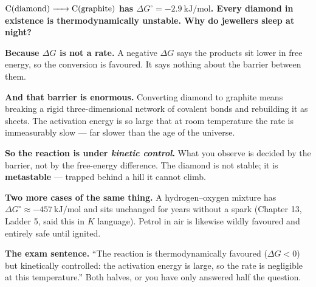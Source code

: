 \documentclass{apchem-worksheet}
\begin{document}
\begin{center}
\end{center}

\begin{workedexample}
\textbf{$\ce{C(diamond) -> C(graphite)}$ has $\Delta G^{\circ} =
\SI{-2.9}{\kilo\joule\per\mole}$. Every diamond in existence is
thermodynamically unstable. Why do jewellers sleep at night?}

\textbf{Because $\Delta G$ is not a rate.} A negative $\Delta G$ says
the products sit lower in free energy, so the conversion is favoured. It
says nothing about the barrier between them.

\textbf{And that barrier is enormous.} Converting diamond to graphite
means breaking a rigid three-dimensional network of covalent bonds and
rebuilding it as sheets. The activation energy is so large that at room
temperature the rate is immeasurably slow --- far slower than the age of
the universe.

\textbf{So the reaction is under \emph{kinetic control}.} What you
observe is decided by the barrier, not by the free-energy difference.
The diamond is not stable; it is \textbf{metastable} --- trapped behind
a hill it cannot climb.

\textbf{Two more cases of the same thing.} A hydrogen--oxygen mixture
has $\Delta G^{\circ} \approx \SI{-457}{\kilo\joule\per\mole}$ and sits
unchanged for years without a spark (Chapter 13, Ladder 5, said this in
$K$ language). Petrol in air is likewise wildly favoured and entirely
safe until ignited.

\textbf{The exam sentence.} ``The reaction is thermodynamically
favoured ($\Delta G < 0$) but kinetically controlled: the activation
energy is large, so the rate is negligible at this temperature.'' Both
halves, or you have only answered half the question.
\end{workedexample}
\end{document}
